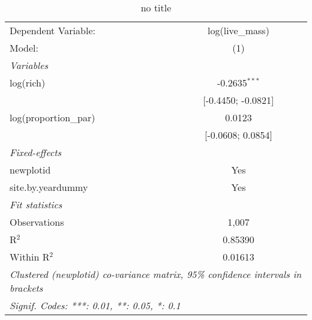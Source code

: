 
\begin{table}[htbp]
   \caption{no title}
   \centering
   \begin{tabular}{lc}
      \tabularnewline \midrule \midrule
      Dependent Variable:   & log(live\_mass)\\   
      Model:                & (1)\\  
      \midrule
      \emph{Variables}\\
      log(rich)             & -0.2635$^{***}$\\   
                            & [-0.4450; -0.0821]\\   
      log(proportion\_par)  & 0.0123\\   
                            & [-0.0608; 0.0854]\\   
      \midrule
      \emph{Fixed-effects}\\
      newplotid             & Yes\\  
      site.by.yeardummy     & Yes\\  
      \midrule
      \emph{Fit statistics}\\
      Observations          & 1,007\\  
      R$^2$                 & 0.85390\\  
      Within R$^2$          & 0.01613\\  
      \midrule \midrule
      \multicolumn{2}{l}{\emph{Clustered (newplotid) co-variance matrix, 95\% confidence intervals in brackets}}\\
      \multicolumn{2}{l}{\emph{Signif. Codes: ***: 0.01, **: 0.05, *: 0.1}}\\
   \end{tabular}
\end{table}


